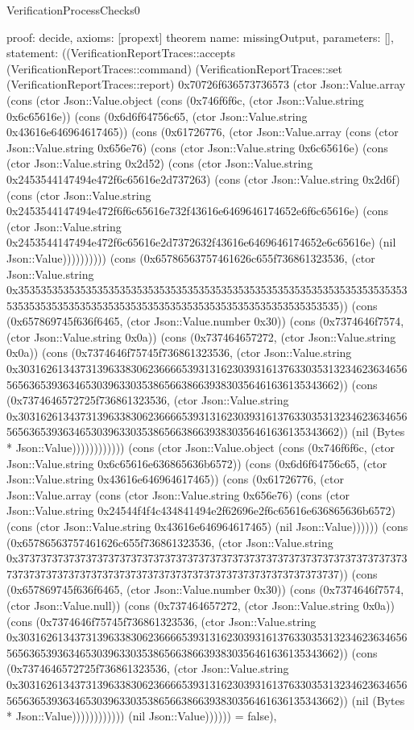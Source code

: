 \begin{lexlean}{VerificationProcessChecks0}
\begin{semanticmodule}
{  proof: decide{},
  axioms: [propext]
}
theorem{
  name: missingOutput,
  parameters: [],
  statement: ((VerificationReportTraces::accepts (VerificationReportTraces::command) (VerificationReportTraces::set (VerificationReportTraces::report) 0x70726f636573736573 (ctor Json::Value.array (cons (ctor Json::Value.object (cons (0x746f6f6c, (ctor Json::Value.string 0x6c65616e)) (cons (0x6d6f64756c65, (ctor Json::Value.string 0x43616e646964617465)) (cons (0x61726776, (ctor Json::Value.array (cons (ctor Json::Value.string 0x656e76) (cons (ctor Json::Value.string 0x6c65616e) (cons (ctor Json::Value.string 0x2d52) (cons (ctor Json::Value.string 0x2453544147494e472f6c65616e2d737263) (cons (ctor Json::Value.string 0x2d6f) (cons (ctor Json::Value.string 0x2453544147494e472f6f6c65616e732f43616e6469646174652e6f6c65616e) (cons (ctor Json::Value.string 0x2453544147494e472f6c65616e2d7372632f43616e6469646174652e6c65616e) (nil Json::Value)))))))))) (cons (0x65786563757461626c655f736861323536, (ctor Json::Value.string 0x35353535353535353535353535353535353535353535353535353535353535353535353535353535353535353535353535353535353535353535353535353535)) (cons (0x657869745f636f6465, (ctor Json::Value.number 0x30)) (cons (0x7374646f7574, (ctor Json::Value.string 0x0a)) (cons (0x737464657272, (ctor Json::Value.string 0x0a)) (cons (0x7374646f75745f736861323536, (ctor Json::Value.string 0x30316261343731396338306236666539313162303931613763303531323462363465656563653936346530396330353865663866393830356461636135343662)) (cons (0x7374646572725f736861323536, (ctor Json::Value.string 0x30316261343731396338306236666539313162303931613763303531323462363465656563653936346530396330353865663866393830356461636135343662)) (nil (Bytes * Json::Value)))))))))))) (cons (ctor Json::Value.object (cons (0x746f6f6c, (ctor Json::Value.string 0x6c65616e636865636b6572)) (cons (0x6d6f64756c65, (ctor Json::Value.string 0x43616e646964617465)) (cons (0x61726776, (ctor Json::Value.array (cons (ctor Json::Value.string 0x656e76) (cons (ctor Json::Value.string 0x24544f4f4c434841494e2f62696e2f6c65616e636865636b6572) (cons (ctor Json::Value.string 0x43616e646964617465) (nil Json::Value)))))) (cons (0x65786563757461626c655f736861323536, (ctor Json::Value.string 0x37373737373737373737373737373737373737373737373737373737373737373737373737373737373737373737373737373737373737373737373737373737)) (cons (0x657869745f636f6465, (ctor Json::Value.number 0x30)) (cons (0x7374646f7574, (ctor Json::Value.null)) (cons (0x737464657272, (ctor Json::Value.string 0x0a)) (cons (0x7374646f75745f736861323536, (ctor Json::Value.string 0x30316261343731396338306236666539313162303931613763303531323462363465656563653936346530396330353865663866393830356461636135343662)) (cons (0x7374646572725f736861323536, (ctor Json::Value.string 0x30316261343731396338306236666539313162303931613763303531323462363465656563653936346530396330353865663866393830356461636135343662)) (nil (Bytes * Json::Value)))))))))))) (nil Json::Value)))))) = false),
}
\end{semanticmodule}
\end{lexlean}
